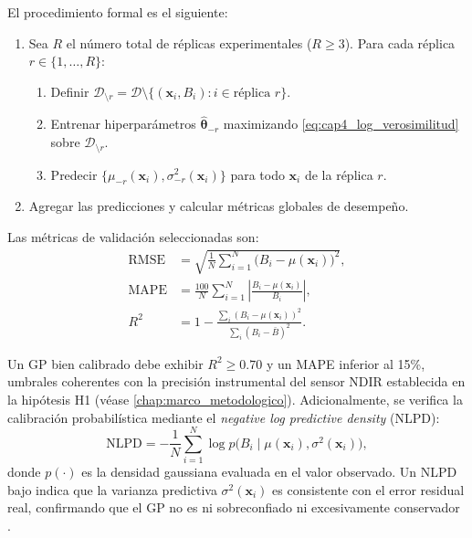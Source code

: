 El procedimiento formal es el siguiente:

\begin{enumerate}
    \item Sea $R$ el número total de réplicas experimentales ($R \geq 3$). Para cada réplica $r \in \{1, \dots, R\}$:
    \begin{enumerate}
        \item Definir $\mathcal{D}_{\setminus r} = \mathcal{D} \setminus \{(\mathbf{x}_i, B_i) : i \in \text{réplica } r\}$.
        \item Entrenar hiperparámetros $\hat{\boldsymbol{\theta}}_{-r}$ maximizando \cref{eq:cap4_log_verosimilitud} sobre $\mathcal{D}_{\setminus r}$.
        \item Predecir $\{\mu_{-r}(\mathbf{x}_i), \sigma_{-r}^{2}(\mathbf{x}_i)\}$ para todo $\mathbf{x}_i$ de la réplica $r$.
    \end{enumerate}
    \item Agregar las predicciones y calcular métricas globales de desempeño.
\end{enumerate}

Las métricas de validación seleccionadas son:
\begin{align}
    \label{eq:cap4_rmse}
    \mathrm{RMSE} &= \sqrt{\frac{1}{N}\sum_{i=1}^{N}\bigl(B_i - \mu(\mathbf{x}_i)\bigr)^{2}}, \\
    \label{eq:cap4_mape}
    \mathrm{MAPE} &= \frac{100}{N}\sum_{i=1}^{N}
    \left|\frac{B_i - \mu(\mathbf{x}_i)}{B_i}\right|, \\
    \label{eq:cap4_r2}
    R^{2} &= 1 - \frac{\sum_{i}(B_i - \mu(\mathbf{x}_i))^{2}}
    {\sum_{i}(B_i - \bar{B})^{2}}.
\end{align}

Un GP bien calibrado debe exhibir $R^{2} \geq \num{0.70}$ y un MAPE inferior al \num{15}\%, umbrales coherentes con la precisión instrumental del sensor NDIR establecida en la hipótesis H1 (véase \cref{chap:marco_metodologico}). Adicionalmente, se verifica la calibración probabilística mediante el \emph{negative log predictive density} (NLPD):
\begin{equation}
    \label{eq:cap4_nlpd}
    \mathrm{NLPD} = -\frac{1}{N}\sum_{i=1}^{N}
    \log p\bigl(B_i \mid \mu(\mathbf{x}_i), \sigma^{2}(\mathbf{x}_i)\bigr),
\end{equation}
donde $p(\cdot)$ es la densidad gaussiana evaluada en el valor observado. Un NLPD bajo indica que la varianza predictiva $\sigma^{2}(\mathbf{x}_i)$ es consistente con el error residual real, confirmando que el GP no es ni sobreconfiado ni excesivamente conservador \parencite{biagiDevelopmentMachineLearningbased2024}.

